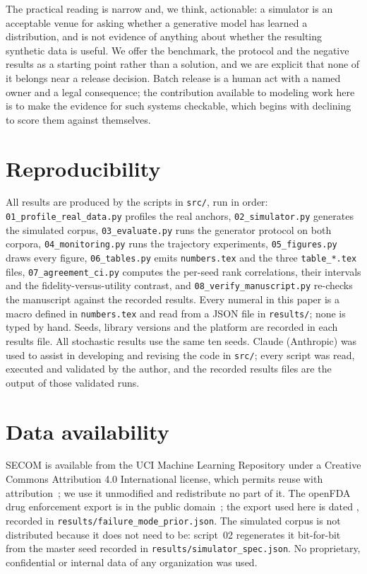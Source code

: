 \documentclass[11pt]{article}
\begin{document}
The practical reading is narrow and, we think, actionable: a simulator is an
acceptable venue for asking whether a generative model has learned a
distribution, and is not evidence of anything about whether the resulting
synthetic data is useful. We offer the benchmark, the protocol and the negative
results as a starting point rather than a solution, and we are explicit that none
of it belongs near a release decision. Batch release is a human act with a named
owner and a legal consequence; the contribution available to modeling work here
is to make the evidence for such systems checkable, which begins with declining
to score them against themselves.

\section*{Reproducibility}

All results are produced by the scripts in \texttt{src/}, run in order:
\texttt{01\_profile\_real\_data.py} profiles the real anchors,
\texttt{02\_simulator.py} generates the simulated corpus,
\texttt{03\_evaluate.py} runs the generator protocol on both corpora,
\texttt{04\_monitoring.py} runs the trajectory experiments,
\texttt{05\_figures.py} draws every figure, \texttt{06\_tables.py} emits
\texttt{numbers.tex} and the three \texttt{table\_*.tex} files,
\texttt{07\_agreement\_ci.py} computes the per-seed rank correlations, their
intervals and the fidelity-versus-utility contrast, and
\texttt{08\_verify\_manuscript.py} re-checks the manuscript against the recorded
results. Every numeral in this paper is a
macro defined in \texttt{numbers.tex} and read from a JSON file in
\texttt{results/}; none is typed by hand. Seeds, library versions and the
platform are recorded in each results file. All stochastic results use the same
ten seeds. Claude (Anthropic) was used to assist in developing and revising the
code in \texttt{src/}; every script was read, executed and validated by the
author, and the recorded results files are the output of those validated runs.

\section*{Data availability}

SECOM is available from the UCI Machine Learning Repository under a Creative
Commons Attribution 4.0 International license, which permits reuse with
attribution~\citep{mccann2008secom}; we use it unmodified and redistribute no
part of it. The openFDA drug enforcement export is in the public
domain~\citep{openfda2026enforcement}; the export used here is dated
\recallExport{}, recorded in \texttt{results/failure\_mode\_prior.json}. The
simulated corpus is not distributed because it does not need to be: script~02
regenerates it bit-for-bit from the master seed recorded in
\texttt{results/simulator\_spec.json}.
No proprietary, confidential or internal data of any organization was used.
\end{document}
